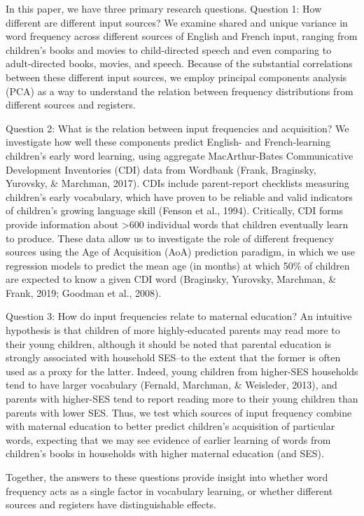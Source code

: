 \documentclass[10pt, letterpaper]{article}
\begin{document}
In this paper, we have three primary research questions. Question 1: How
different are different input sources? We examine shared and unique
variance in word frequency across different sources of English and
French input, ranging from children's books and movies to child-directed
speech and even comparing to adult-directed books, movies, and speech.
Because of the substantial correlations between these different input
sources, we employ principal components analysis (PCA) as a way to
understand the relation between frequency distributions from different
sources and registers.

Question 2: What is the relation between input frequencies and
acquisition? We investigate how well these components predict English-
and French-learning children's early word learning, using aggregate
MacArthur-Bates Communicative Development Inventories (CDI) data from
Wordbank (Frank, Braginsky, Yurovsky, \& Marchman, 2017). CDIs include
parent-report checklists measuring children's early vocabulary, which
have proven to be reliable and valid indicators of children's growing
language skill (Fenson et al., 1994). Critically, CDI forms provide
information about \textgreater600 individual words that children
eventually learn to produce. These data allow us to investigate the role
of different frequency sources using the Age of Acquisition (AoA)
prediction paradigm, in which we use regression models to predict the
mean age (in months) at which 50\% of children are expected to know a
given CDI word (Braginsky, Yurovsky, Marchman, \& Frank, 2019; Goodman
et al., 2008).

Question 3: How do input frequencies relate to maternal education? An
intuitive hypothesis is that children of more highly-educated parents
may read more to their young children, although it should be noted that
parental education is strongly associated with household SES--to the
extent that the former is often used as a proxy for the latter. Indeed,
young children from higher-SES households tend to have larger vocabulary
(Fernald, Marchman, \& Weisleder, 2013), and parents with higher-SES
tend to report reading more to their young children than parents with
lower SES. Thus, we test which sources of input frequency combine with
maternal education to better predict children's acquisition of
particular words, expecting that we may see evidence of earlier learning
of words from children's books in households with higher maternal
education (and SES).

Together, the answers to these questions provide insight into whether
word frequency acts as a single factor in vocabulary learning, or
whether different sources and registers have distinguishable effects.
\end{document}
